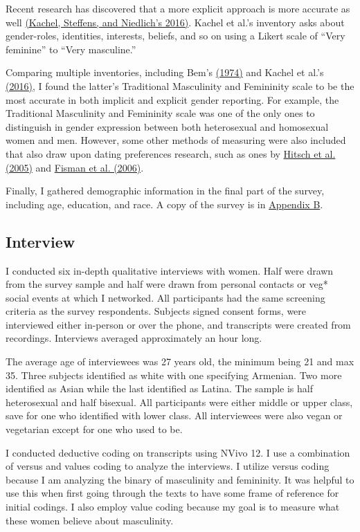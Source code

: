 \documentclass[twoside]{report}
\begin{document}
Recent research has discovered that a more explicit approach is more accurate as well \hyperlink{kachel}{(Kachel, Steffens, and Niedlich's 2016)}. Kachel et al.'s inventory asks about gender-roles, identities, interests, beliefs, and so on using a Likert scale of ``Very feminine'' to ``Very masculine.'' 

Comparing multiple inventories, including Bem's \hyperlink{bem}{(1974)} and Kachel et al.'s \hyperlink{kachel}{(2016)}, I found the latter's
Traditional Masculinity and Femininity scale to be the most accurate in
both implicit and explicit gender reporting. For example, the Traditional Masculinity and Femininity scale was one of the only ones to distinguish in gender expression between both heterosexual and homosexual women and men. However, some other methods of measuring were also included that also draw upon dating preferences research, such as ones by \hyperlink{hitsch1}{Hitsch et al. (2005)} and \hyperlink{fisman}{Fisman et al. (2006)}. 

Finally, I gathered demographic information in the final part of the survey, including age, education, and race. A copy of the survey is in  \hyperlink{appendix-b}{Appendix B}.

\subsection{Interview}

I conducted six in-depth qualitative interviews with women. Half were drawn from the survey sample and half were drawn from personal contacts or veg* social events at which I networked. All participants had the same screening criteria as the survey respondents. Subjects signed consent forms, were interviewed either in-person or over the phone, and transcripts were created from recordings. Interviews averaged approximately an hour long.

The average age of interviewees was 27 years old, the minimum being 21 and max 35. Three subjects identified as white with one specifying Armenian. Two more
identified as Asian while the last identified as Latina. The sample is
half heterosexual and half bisexual. All participants were either middle
or upper class, save for one who identified with lower class. All
interviewees were also vegan or vegetarian except for one who used to be.

I conducted deductive coding on transcripts using NVivo 12. I use a
combination of versus and values coding to analyze the interviews. I
utilize versus coding because I am analyzing the binary of masculinity
and femininity. It was helpful to use this when first going through the
texts to have some frame of reference for initial codings. I also employ
value coding because my goal is to measure what these women believe
about masculinity. 
\end{document}
